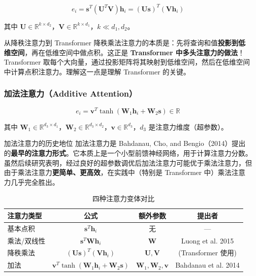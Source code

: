 \documentclass[a4paper]{article}
\begin{document}
$$e_i = \mathbf{s}^T (\mathbf{U}^T \mathbf{V}) \mathbf{h}_i = (\mathbf{U}\mathbf{s})^T (\mathbf{V}\mathbf{h}_i)$$

其中 $\mathbf{U} \in \mathbb{R}^{k \times d_2}$，$\mathbf{V} \in \mathbb{R}^{k \times d_1}$，$k \ll d_1, d_2$。





\begin{importantbox}{从降秩注意力到 Transformer}
降秩乘法注意力的本质是：先将查询和值\textbf{投影到低维空间}，再在低维空间中做点积。这正是 \textbf{Transformer 中多头注意力的做法}！Transformer 取每个大向量，通过投影矩阵将其映射到低维空间，然后在低维空间中计算点积注意力。理解这一点是理解 Transformer 的关键。
\end{importantbox}

\subsubsection{加法注意力（Additive Attention）}

$$e_i = \mathbf{v}^T \tanh(\mathbf{W}_1 \mathbf{h}_i + \mathbf{W}_2 \mathbf{s}) \in \mathbb{R}$$

其中 $\mathbf{W}_1 \in \mathbb{R}^{d_3 \times d_1}$，$\mathbf{W}_2 \in \mathbb{R}^{d_3 \times d_2}$，$\mathbf{v} \in \mathbb{R}^{d_3}$，$d_3$ 是注意力维度（超参数）。

\begin{knowledgebox}{加法注意力的历史地位}
加法注意力是 Bahdanau, Cho, and Bengio（2014）提出的\textbf{最早的注意力形式}。它本质上是一个小型前馈神经网络，用于计算注意力分数。虽然后续研究表明，经过良好的超参数调优后加法注意力可能优于乘法注意力，但由于乘法注意力\textbf{更简单、更高效}，在实践中（特别是 Transformer 中）乘法注意力几乎完全胜出。
\end{knowledgebox}

\begin{table}[H]
\centering
\begin{tabular}{lccc}
\toprule
\textbf{注意力类型} & \textbf{公式} & \textbf{额外参数} & \textbf{提出者} \\
\midrule
基本点积 & $\mathbf{s}^T \mathbf{h}_i$ & 无 & --- \\
乘法/双线性 & $\mathbf{s}^T \mathbf{W} \mathbf{h}_i$ & $\mathbf{W}$ & Luong et al. 2015 \\
降秩乘法 & $(\mathbf{U}\mathbf{s})^T(\mathbf{V}\mathbf{h}_i)$ & $\mathbf{U}, \mathbf{V}$ & (Transformer 使用) \\
加法 & $\mathbf{v}^T \tanh(\mathbf{W}_1 \mathbf{h}_i + \mathbf{W}_2 \mathbf{s})$ & $\mathbf{W}_1, \mathbf{W}_2, \mathbf{v}$ & Bahdanau et al. 2014 \\
\bottomrule
\end{tabular}
\caption{四种注意力变体对比}
\end{table}
\end{document}
